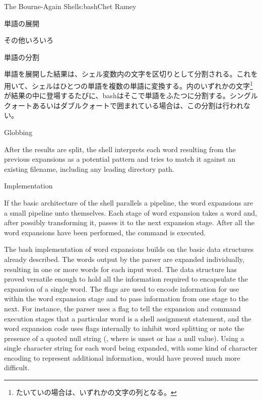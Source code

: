 \begin{aosachapter}{The Bourne-Again Shell}{s:bash}{Chet Ramey}
\begin{aosasect1}{単語の展開}
\begin{aosasect2}{その他いろいろ}
\end{aosasect2}

\begin{aosasect2}{単語の分割}

単語を展開した結果は、シェル変数内の文字を区切りとして分割される。これを用いて、シェルはひとつの単語を複数の単語に変換する。内のいずれかの文字\footnote{たいていの場合は、いずれかの文字の列となる。}が結果の中に登場するたびに、bashはそこで単語をふたつに分割する。シングルクォートあるいはダブルクォートで囲まれている場合は、この分割は行われない。

\end{aosasect2}

\begin{aosasect2}{Globbing}

After the results are split, the shell interprets each word resulting
from the previous expansions as a potential pattern and tries to match
it against an existing filename, including any leading directory path.

\end{aosasect2}

\begin{aosasect2}{Implementation}

If the basic architecture of the shell parallels a pipeline, the word
expansions are a small pipeline unto themselves.  Each stage of word
expansion takes a word and, after possibly transforming it, passes it
to the next expansion stage.  After all the word expansions have been
performed, the command is executed.

The bash implementation of word expansions builds on the basic data
structures already described.  The words output by the parser are
expanded individually, resulting in one or more words for each input
word.  The  data structure has proved versatile
enough to hold all the information required to encapsulate the
expansion of a single word. The flags are used to encode information
for use within the word expansion stage and to pass information from
one stage to the next. For instance, the parser uses a flag to tell
the expansion and command execution stages that a particular word is a
shell assignment statement, and the word expansion code uses flags
internally to inhibit word splitting or note the presence of a quoted
null string (, where  is unset or has a null
value).  Using a single character string for each word being expanded,
with some kind of character encoding to represent additional
information, would have proved much more difficult.


\end{aosasect2}
\end{aosasect1}
\end{aosachapter}
